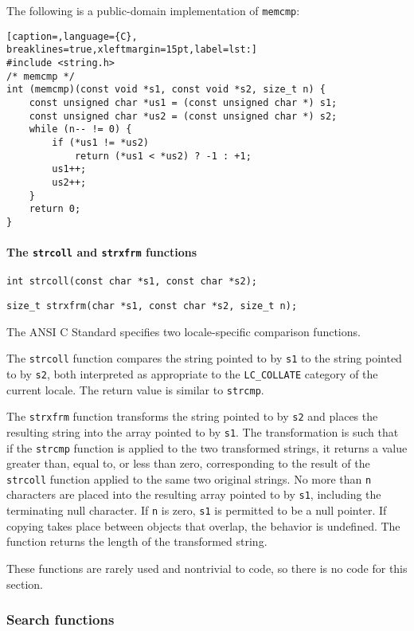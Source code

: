 The following is a public-domain implementation of \texttt{memcmp}:
\lstset{basicstyle=\scriptsize, numbers=left, captionpos=b, tabsize=4}
\begin{lstlisting}[caption=,language={C},
breaklines=true,xleftmargin=15pt,label=lst:]
#include <string.h>
/* memcmp */
int (memcmp)(const void *s1, const void *s2, size_t n) {
	const unsigned char *us1 = (const unsigned char *) s1;
	const unsigned char *us2 = (const unsigned char *) s2;
	while (n-- != 0) {
		if (*us1 != *us2)
			return (*us1 < *us2) ? -1 : +1;
		us1++;
		us2++;
	}
	return 0;
}
\end{lstlisting}

\paragraph{The \texttt{strcoll} and \texttt{strxfrm} functions}
\texttt{int strcoll(const char *s1, const char *s2);}

\texttt{size\_t strxfrm(char *s1, const char *s2, size\_t n);}

The ANSI C Standard specifies two locale-specific comparison functions.

The \texttt{strcoll} function compares the string pointed to by \texttt{s1} to
the string pointed to by \texttt{s2}, both interpreted as appropriate to the
\texttt{LC\_COLLATE} category of the current locale. The return value is
similar to \texttt{strcmp}.

The \texttt{strxfrm} function transforms the string pointed to by \texttt{s2}
and places the resulting string into the array pointed to by \texttt{s1}. The
transformation is such that if the \texttt{strcmp} function is applied to the
two transformed strings, it returns a value greater than, equal to, or less
than zero, corresponding to the result of the \texttt{strcoll} function applied
to the same two original strings. No more than \texttt{n} characters are placed
into the resulting array pointed to by \texttt{s1}, including the terminating
null character. If \texttt{n} is zero, \texttt{s1} is permitted to be a null
pointer. If copying takes place between objects that overlap, the behavior is
undefined. The function returns the length of the transformed string.

These functions are rarely used and nontrivial to code, so there is no code for
this section.

\subsubsection{Search functions}


